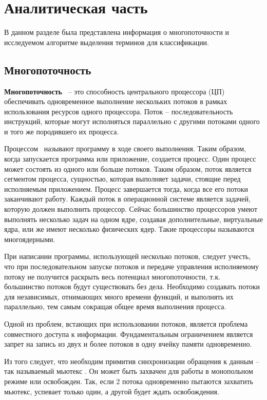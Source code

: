 \chapter{Аналитическая часть}
В данном разделе была представлена информация о многопоточности и исследуемом алгоритме выделения терминов для классификации.

\section{Многопоточность}

\textbf{Многопоточность}~\cite{multithreading} -- это способность центрального процессора (ЦП) обеспечивать одновременное выполнение нескольких потоков в рамках использования ресурсов одного процессора. Поток -- последовательность инструкций, которые могут исполняться параллельно с другими потоками одного и того же породившего их процесса.

Процессом~\cite{process} называют программу в ходе своего выполнения. Таким образом, когда запускается программа или приложение, создается процесс. Один процесс может состоять из одного или больше потоков.
Таким образом, поток является сегментом процесса, сущностью, которая выполняет задачи, стоящие перед исполняемым приложением. 
Процесс завершается тогда, когда все его потоки заканчивают работу.
Каждый поток в операционной системе является задачей, которую должен выполнить процессор. Сейчас большинство процессоров умеют выполнять несколько задач на одном ядре, создавая дополнительные, виртуальные ядра, или же имеют несколько физических ядер. Такие процессоры называются многоядерными. 

При написании программы, использующей несколько потоков, следует учесть, что при последовательном запуске потоков и передаче управления исполняемому потоку не получится раскрыть весь потенциал многопоточности, т.к. большинство потоков будут существовать без дела.
Необходимо создавать потоки для независимых, отнимающих много времени функций, и выполнять их параллельно, тем самым сокращая общее время выполнения процесса.

Одной из проблем, встающих при использовании потоков, является проблема совместного доступа к информации. Фундаментальным ограничением является запрет на запись из двух и более потоков в одну ячейку памяти одновременно.

Из того следует, что необходим примитив синхронизации обращения к данным -- так называемый мьютекс . 
Он может быть захвачен для работы в монопольном режиме или освобожден. 
Так, если 2 потока одновременно пытаются захватить мьютекс, успевает только один, а другой будет ждать освобождения. 

